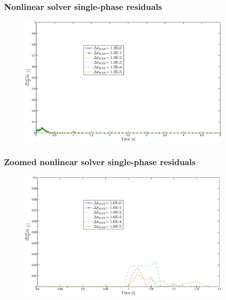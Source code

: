 \documentclass[compress,xcolor=table]{beamer}
\begin{document}
\begin{frame}
\frametitle{Nonlinear solver single-phase residuals}

\begin{figure}[h!t]
\centering
\includegraphics[width=0.94\textwidth]{images/nl_single_res_v_dt.eps}
\end{figure}

\end{frame}
\begin{frame}
\frametitle{Zoomed nonlinear solver single-phase residuals}

\begin{figure}[h!t]
\centering
\includegraphics[width=0.94\textwidth]{images/nl_res_single_zoom.eps}
\end{figure}

\end{frame}
\end{document}

